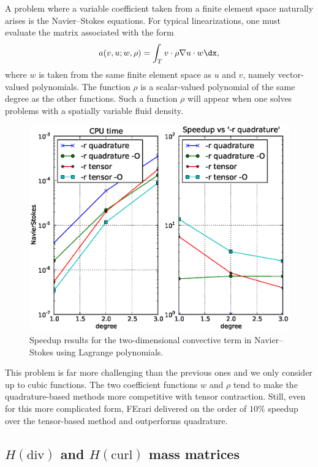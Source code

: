 A problem where a variable coefficient taken from a finite element
space naturally arises is the Navier--Stokes equations. For typical
linearizations, one must evaluate the matrix associated with the form
\begin{equation}
  a(v, u; w, \rho) = \int_T v \cdot \rho \nabla u \cdot w \dx,
\end{equation}
where \( w \) is taken from the same finite element space as \( u \)
and \( v \), namely vector-valued polynomials. The function \( \rho \)
is a scalar-valued polynomial of the same degree as the other
functions. Such a function \( \rho \) will appear when one solves
problems with a spatially variable fluid density.

\begin{figure}
  \begin{center}
    \includegraphics[width=12cm]{chapters/kirby-3/eps/NavierStokes.eps}
    \caption{Speedup results for the two-dimensional convective term
      in Navier--Stokes using Lagrange polynomials.}
    \label{fig:NavierStokes}
  \end{center}
\end{figure}

This problem is far more challenging than the previous ones and we
only consider up to cubic functions. The two coefficient functions \(
w \) and \( \rho \) tend to make the quadrature-based methods more
competitive with tensor contraction.  Still, even for this more
complicated form, FErari delivered on the order of \( 10\% \) speedup
over the tensor-based method and outperforms quadrature.

\subsection{$H(\mathrm{div})$ and $H(\mathrm{curl})$ mass matrices}

